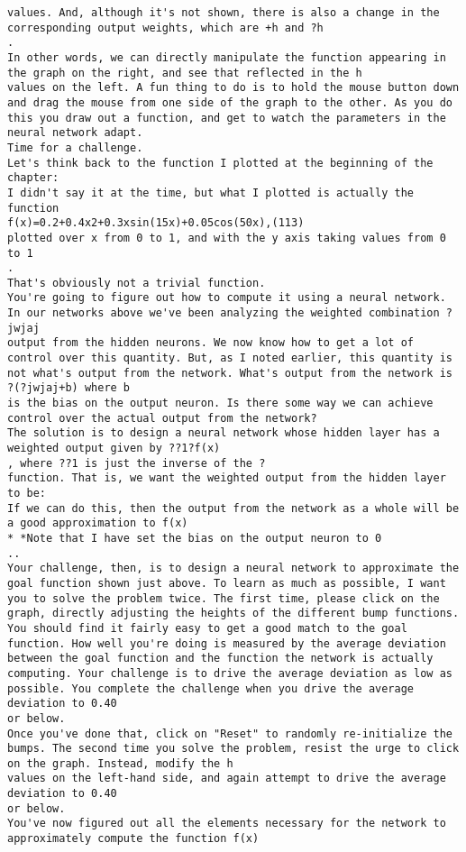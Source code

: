 \begin{lstlisting}
values. And, although it's not shown, there is also a change in the corresponding output weights, which are +h and ?h
.
In other words, we can directly manipulate the function appearing in the graph on the right, and see that reflected in the h
values on the left. A fun thing to do is to hold the mouse button down and drag the mouse from one side of the graph to the other. As you do this you draw out a function, and get to watch the parameters in the neural network adapt.
Time for a challenge.
Let's think back to the function I plotted at the beginning of the chapter:
I didn't say it at the time, but what I plotted is actually the function 
f(x)=0.2+0.4x2+0.3xsin(15x)+0.05cos(50x),(113)
plotted over x from 0 to 1, and with the y axis taking values from 0 to 1
.
That's obviously not a trivial function.
You're going to figure out how to compute it using a neural network.
In our networks above we've been analyzing the weighted combination ?jwjaj
output from the hidden neurons. We now know how to get a lot of control over this quantity. But, as I noted earlier, this quantity is not what's output from the network. What's output from the network is ?(?jwjaj+b) where b
is the bias on the output neuron. Is there some way we can achieve control over the actual output from the network?
The solution is to design a neural network whose hidden layer has a weighted output given by ??1?f(x)
, where ??1 is just the inverse of the ?
function. That is, we want the weighted output from the hidden layer to be:
If we can do this, then the output from the network as a whole will be a good approximation to f(x)
* *Note that I have set the bias on the output neuron to 0
..
Your challenge, then, is to design a neural network to approximate the goal function shown just above. To learn as much as possible, I want you to solve the problem twice. The first time, please click on the graph, directly adjusting the heights of the different bump functions. You should find it fairly easy to get a good match to the goal function. How well you're doing is measured by the average deviation between the goal function and the function the network is actually computing. Your challenge is to drive the average deviation as low as possible. You complete the challenge when you drive the average deviation to 0.40
or below.
Once you've done that, click on "Reset" to randomly re-initialize the bumps. The second time you solve the problem, resist the urge to click on the graph. Instead, modify the h
values on the left-hand side, and again attempt to drive the average deviation to 0.40
or below.
You've now figured out all the elements necessary for the network to approximately compute the function f(x)

\end{lstlisting}
